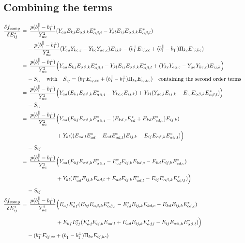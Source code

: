 \documentclass{article}
\newcommand{\YY}[3][j]{E_{#2#1}E_{#3#1}^*}
\begin{document}
\subsection{Combining the terms}
\begin{align}
    \fdv{f_\text{comp}}{E_{ij}^*} =&\enspace \frac{p(b_1^\parallel - b_1^\perp)}{Y_{aa}^2} (Y_{aa}E_{kj}E_{\alpha\beta,k}E_{\alpha\beta,i}^* - Y_{kl}E_{ij} E_{\alpha\beta,k}E_{\alpha\beta,l}^*) \\
    &- \frac{p(b_1^\parallel - b_1^\perp)}{Y_{aa}^2} (Y_{aa}Y_{kc,c} - Y_{kc} Y_{aa,c}) E_{ij,k} - (b_1^\perp E_{ij,cc} + (b_1^\parallel - b_1^\perp) \Pi_{kc} E_{ij,kc}) \\
    =&\enspace \frac{p(b_1^\parallel - b_1^\perp)}{Y_{aa}^2}\Bigl(Y_{aa}E_{kj}E_{\alpha\beta,k}E_{\alpha\beta,i}^* - Y_{kl}E_{ij} E_{\alpha\beta,k}E_{\alpha\beta,l}^* + (Y_{kc} Y_{aa,c} - Y_{aa}Y_{kc,c})E_{ij,k}\Bigr) \\
    &- S_{ij} \qq{with} S_{ij} = (b_1^\perp E_{ij,cc} + (b_1^\parallel - b_1^\perp) \Pi_{kc} E_{ij,kc}) \qq{containing the second order terms} \\
    =&\enspace \frac{p(b_1^\parallel - b_1^\perp)}{Y_{aa}^2}\Bigl(Y_{aa}(E_{kj}E_{\alpha\beta,k}E_{\alpha\beta,i}^* - Y_{kc,c}E_{ij,k}) + Y_{kl}(Y_{aa,l}E_{ij,k} - E_{ij} E_{\alpha\beta,k}E_{\alpha\beta,l}^*)\Bigr) \\
    &- S_{ij} \\
    =&\enspace \frac{p(b_1^\parallel - b_1^\perp)}{Y_{aa}^2}\Bigl(Y_{aa}(E_{kj}E_{\alpha\beta,k}E_{\alpha\beta,i}^* - (E_{kd,c}E_{cd}^* + E_{kd}E_{cd,c}^*)E_{ij,k}) \\*
    &\phantom{\enspace \frac{p(b_1^\parallel - b_1^\perp)}{Y_{aa}^2}}+ Y_{kl}((E_{ad,l}E_{ad}^* + E_{ad}E_{ad,l}^*)E_{ij,k} - E_{ij} E_{\alpha\beta,k}E_{\alpha\beta,l}^*)\Bigr) \\*
    &- S_{ij} \\
    =&\enspace \frac{p(b_1^\parallel - b_1^\perp)}{Y_{aa}^2}\Bigl(Y_{aa}(E_{kj}E_{\alpha\beta,k}E_{\alpha\beta,i}^* - E_{cd}^*E_{ij,k}E_{kd,c} - E_{kd}E_{ij,k}E_{cd,c}^*) \\*
    &\phantom{\enspace \frac{p(b_1^\parallel - b_1^\perp)}{Y_{aa}^2}}+ Y_{kl}(E_{ad}^*E_{ij,k}E_{ad,l} + E_{ad}E_{ij,k}E_{ad,l}^* - E_{ij} E_{\alpha\beta,k}E_{\alpha\beta,l}^*)\Bigr) \\*
    &- S_{ij} \\
    \fdv{f_\text{comp}}{E_{ij}^*} =&\enspace \frac{p(b_1^\parallel - b_1^\perp)}{Y_{aa}^2}\Bigl(\YY[f]{a}{a}(E_{kj}E_{\alpha\beta,k}E_{\alpha\beta,i}^* - E_{cd}^*E_{ij,k}E_{kd,c} - E_{kd}E_{ij,k}E_{cd,c}^*) \\*
    &\phantom{\enspace \frac{p(b_1^\parallel - b_1^\perp)}{Y_{aa}^2}}+ \YY[f]{k}{l}(E_{ad}^*E_{ij,k}E_{ad,l} + E_{ad}E_{ij,k}E_{ad,l}^* - E_{ij} E_{\alpha\beta,k}E_{\alpha\beta,l}^*)\Bigr) \\*
    &- (b_1^\perp E_{ij,cc} + (b_1^\parallel - b_1^\perp) \Pi_{kc} E_{ij,kc}) \\
\end{align}
\end{document}
